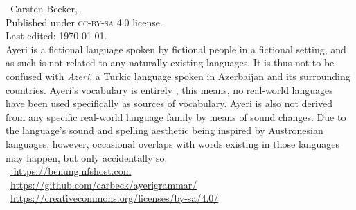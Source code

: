 

\begin{minipage}[b][\textheight][b]{0.67\textwidth}\small
\ccbysa~Carsten Becker, \the\year.\\
Published under \textsc{cc-by-sa} 4.0 license.\\
Last edited: \today{}.\\[.5\baselineskip]


Ayeri is a fictional language spoken by fictional people in a fictional setting, 
and as such is not related to any naturally existing languages. It is thus not 
to be confused with \emph{Azeri}, a Turkic language spoken in Azerbaijan and its 
surrounding countries. Ayeri’s vocabulary is entirely , this 
means, no real-world languages have been used specifically as sources of 
vocabulary. Ayeri is also not derived from any specific real-world language 
family by means of sound changes. Due to the language’s sound and spelling 
aesthetic being inspired by Austronesian languages, however, occasional 
overlaps with words existing in those languages may happen, but only  
accidentally so.\\[.5\baselineskip]

~\href{https://benung.nfshost.com}{%
https://benung.nfshost.com}\\
%
~\href{https://github.com/carbeck/ayerigrammar}
{https://github.com/carbeck/ayerigrammar/}\\
%
~\href{%
https://creativecommons.org/licenses/by-sa/4.0/}%
{https://creativecommons.org/licenses/by-sa/4.0/}%

\end{minipage}
